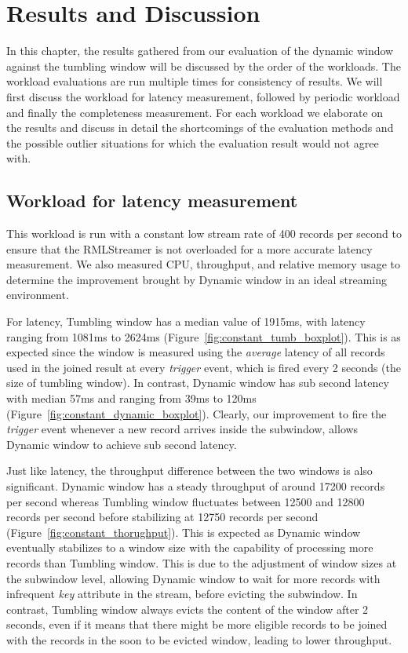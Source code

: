 \chapter{Results and Discussion}%
\label{chap:Results and Discussion}

In this chapter, the results gathered from our evaluation of the dynamic window against 
the tumbling window will be discussed by the order of the workloads. The workload 
evaluations are run multiple times for consistency of results. We will first 
discuss the workload for latency measurement, followed by periodic workload and 
finally the completeness measurement. For each workload we elaborate on the results
and discuss in detail the shortcomings of the evaluation methods and the 
possible outlier situations for which the evaluation result would not agree with.



\section{Workload for latency measurement}%
\label{sec:Results Workload for latency measurement}

This workload is run with a constant low stream rate
of 400 records per second
to ensure that 
the RMLStreamer is not overloaded for a more accurate latency measurement. We also measured 
CPU, throughput, and relative memory usage to determine the improvement brought by Dynamic window
in an ideal streaming environment.

For latency, Tumbling window has a median value of 1915ms, with latency ranging from 1081ms to 2624ms (Figure~\ref{fig:constant_tumb_boxplot}). 
This is as expected since the window is measured using the \emph{average} latency of all records used 
in the joined result at every \emph{trigger} event, which is fired every 2 seconds (the size of tumbling window).
In contrast, Dynamic window has sub second latency with median 57ms and ranging from 39ms to 120ms (Figure~\ref{fig:constant_dynamic_boxplot}). Clearly, 
our improvement to fire the \emph{trigger} event whenever a new record arrives inside the subwindow, allows 
Dynamic window to achieve sub second latency. 

Just like latency, the throughput difference between the two windows is also significant. Dynamic window has a 
steady throughput of around 17200 records per second whereas Tumbling window fluctuates between 
12500 and 12800 records per second before stabilizing at 12750 records per second (Figure~\ref{fig:constant_thorughput}). This is expected as Dynamic 
window eventually stabilizes to a window size with the capability of processing more records than Tumbling window. This is 
due to the adjustment of window sizes at the subwindow level, allowing Dynamic window to wait for more records 
with infrequent \emph{key} attribute in the stream, before evicting the subwindow. In contrast, Tumbling window 
always evicts the content of the window after 2 seconds, even if it means that there might be more 
eligible records to be joined with the records in the soon to be evicted window, leading to lower throughput.  


